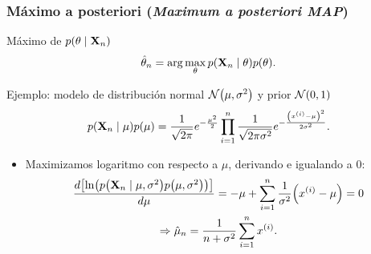\documentclass[table]{beamer}
\begin{document}
\begin{frame}
    \frametitle{Máximo a posteriori (\emph{Maximum a posteriori MAP})}
    \begin{block}{Máximo de $\pdf{\theta \mid \Xvec_{n}}$}
        \begin{equation*}
            \hat{\theta}_{n}
            = \arg \max_{\theta} \pdf{\Xvec_{n} \mid \theta} \pdf{\theta} .
        \end{equation*}
    \end{block}
    \begin{exampleblock}{Ejemplo: modelo de distribución normal $\normal{\mu}{\sigma^{2}}$ y prior $\normal{0}{1}$}
        \begin{equation*}
            \pdf{\Xvec_{n} \mid \mu}
            \pdf{\mu}
            = \frac{1}{\sqrt{2 \pi}} e^{- \frac{\mu^{2}}{2}} \prod_{i = 1}^{n} \frac{1}{\sqrt{2 \pi \sigma^{2}}} e^{- \frac{\parens{x^{\parens{i}} - \mu}^{2}}{2 \sigma^{2}}} .
        \end{equation*}
        \begin{itemize}
            \item Maximizamos logaritmo con respecto a $\mu$, derivando e igualando a $0$:
                \begin{multline*}
                    \frac{d \sparens{\ln \parens{\pdf{\Xvec_{n} \mid \mu , \sigma^{2}} \pdf{\mu , \sigma^{2}}}}}{d \mu}
                    = - \mu + \sum_{i = 1}^{n} \frac{1}{\sigma^{2}} \parens{x^{\parens{i}} - \mu}
                    = 0
                    \\
                    \Rightarrow \hat{\mu}_{n} = \frac{1}{n + \sigma^{2}} \sum_{i = 1}^{n} x^{\parens{i}} .
                \end{multline*}
        \end{itemize}
    \end{exampleblock}
\end{frame}
\end{document}
